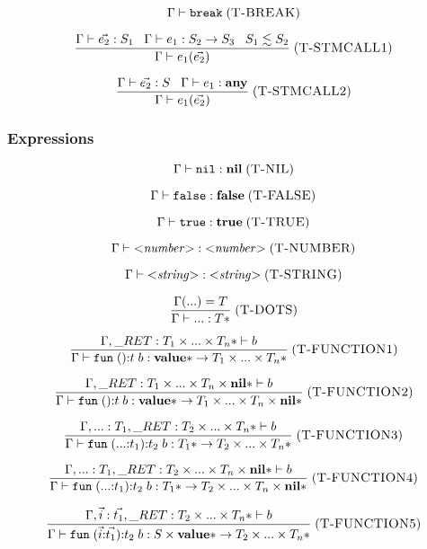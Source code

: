 \documentclass[12pt]{article}
\newcommand{\Top}{\mathbf{value}}
\newcommand{\Any}{\mathbf{any}}
\newcommand{\Nil}{\mathbf{nil}}
\newcommand{\False}{\mathbf{false}}
\newcommand{\True}{\mathbf{true}}
\newcommand{\kw}[1]{\mathbf{\texttt{#1}}}
\newcommand{\mylabel}[1]{\; (\textsc{#1})}
\newcommand{\env}{\Gamma}
\newcommand{\ret}{\string_RET}
\begin{document}
\[
\env \vdash \kw{break}
\mylabel{T-BREAK}
\]

\[
\frac{\env \vdash \vec{e_{2}}:S_{1} \;\;\;
      \env \vdash e_{1}:S_{2} \rightarrow S_{3} \;\;\;
      S_{1} \lesssim S_{2}}
     {\env \vdash e_{1}(\vec{e_{2}})}
\mylabel{T-STMCALL1}
\]

\[
\frac{\env \vdash \vec{e_{2}}:S \;\;\;
      \env \vdash e_{1}:\Any}
     {\env \vdash e_{1}(\vec{e_{2}})}
\mylabel{T-STMCALL2}
\]

\subsubsection{Expressions}

\[
\env \vdash \kw{nil} : \Nil
\mylabel{T-NIL}
\]

\[
\env \vdash \kw{false} : \False
\mylabel{T-FALSE}
\]

\[
\env \vdash \kw{true} : \True
\mylabel{T-TRUE}
\]

\[
\env \vdash {<}{\it number}{>} : {<}{\it number}{>}
\mylabel{T-NUMBER}
\]

\[
\env \vdash {<}{\it string}{>} : {<}{\it string}{>}
\mylabel{T-STRING}
\]

\[
\frac{\env({...}) = T}
     {\env \vdash {...} : T{*}}
\mylabel{T-DOTS}
\]

\[
\frac{\env, \ret:T_{1} \times ... \times T_{n}* \vdash b}
     {\env \vdash \kw{fun} \; (){:}t \; b :
      \Top{*} \rightarrow T_{1} \times ... \times T_{n}*}
\mylabel{T-FUNCTION1}
\]

\[
\frac{\env, \ret:T_{1} \times ... \times T_{n} \times \Nil{*} \vdash b}
     {\env \vdash \kw{fun} \; (){:}t \; b :
      \Top{*} \rightarrow T_{1} \times ... \times T_{n} \times \Nil{*}}
\mylabel{T-FUNCTION2}
\]

\[
\frac{\env, {...}:T_{1}, \ret:T_{2} \times ... \times T_{n}* \vdash b}
     {\env \vdash \kw{fun} \; ({...}{:}t_{1}){:}t_{2} \; b :
      T_{1}{*} \rightarrow T_{2} \times ... \times T_{n}*}
\mylabel{T-FUNCTION3}
\]

\[
\frac{\env, {...}:T_{1}, \ret:T_{2} \times ... \times T_{n} \times \Nil{*} \vdash b}
     {\env \vdash \kw{fun} \; ({...}{:}t_{1}){:}t_{2} \; b :
      T_{1}{*} \rightarrow T_{2} \times ... \times T_{n} \times \Nil{*}}
\mylabel{T-FUNCTION4}
\]

\[
\frac{\env, \vec{i}:\vec{t_{1}},
      \ret:T_{2} \times ... \times T_{n}* \vdash b}
     {\env \vdash \kw{fun} \; (\vec{i}{:}\vec{t_{1}}){:}t_{2} \; b :
      S \times \Top{*} \rightarrow T_{2} \times ... \times T_{n}*}
\mylabel{T-FUNCTION5}
\]
\end{document}
